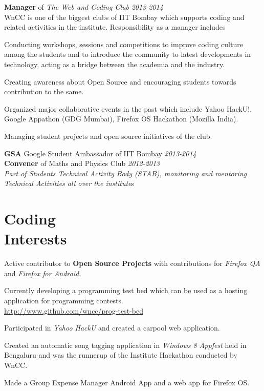 \documentclass[margin,11pt]{resume}
\begin{document}
\begin{resume}
\textbf{Manager} of \emph{The Web and Coding Club} \hfill \emph{2013-2014}\\
WnCC is one of the biggest clubs of IIT Bombay which supports coding and related activities in the institute. Responsibility as a manager includes
\begin{list2}
\item Conducting workshops, sessions and competitions to improve coding culture among the students and to introduce the community to latest developments in technology, acting as a bridge between the academia and the industry. 
\item Creating awareness about Open Source and encouraging students towards contribution to the same. 
\item Organized major collaborative events in the past which include Yahoo HackU!, Google Appathon (GDG Mumbai), Firefox OS Hackathon (Mozilla India). 
\item Managing student projects and open source initiatives of the club. 
\end{list2}
\textbf{GSA} Google Student Ambassador of IIT Bombay \hfill \emph{2013-2014} \\
\textbf{Convener} of Maths and Physics Club \hfill \emph{2012-2013} \\
\emph{Part of Students Technical Activity Body (STAB), monitoring and mentoring Technical Activities all over the institute}s

\section{\mysidestyle Coding \\ Interests}

\begin{list2}
\item Active contributor to \textbf{Open Source Projects} with contributions for \emph{Firefox QA} and \emph{Firefox for Android}.
\item Currently developing a programming test bed which can be used as a hosting application for programming contests.\\ \url{http://www.github.com/wncc/prog-test-bed} 
\item Participated in \emph{Yahoo HackU} and created a carpool web application.
\item Created an automatic song tagging application in \emph{Windows 8 Appfest} held in Bengaluru and was the runnerup of the Institute Hackathon conducted by WnCC.
\item Made a Group Expense Manager Android App and a web app for Firefox OS.
\end{list2}


\end{resume}
\end{document}
